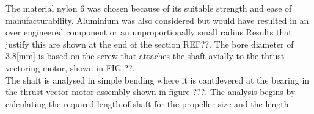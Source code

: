 \documentclass[../main.tex]{subfiles}
\begin{document}
The material nylon 6 was chosen because of its suitable strength and ease of manufacturability. Aluminium was also considered but would have resulted in an over engineered component or an unproportionally small radius Results that justify this are shown at the end of the section REF??. The bore diameter of 3.8[mm] is based on the screw that attaches the shaft axially to the thrust vectoring motor, shown in FIG ??.\\

The shaft is analysed in simple bending where it is cantilevered at the bearing in the thrust vector motor assembly shown in figure ???. The analysis begins by calculating the required length of shaft for the propeller size and the length 
\end{document}
